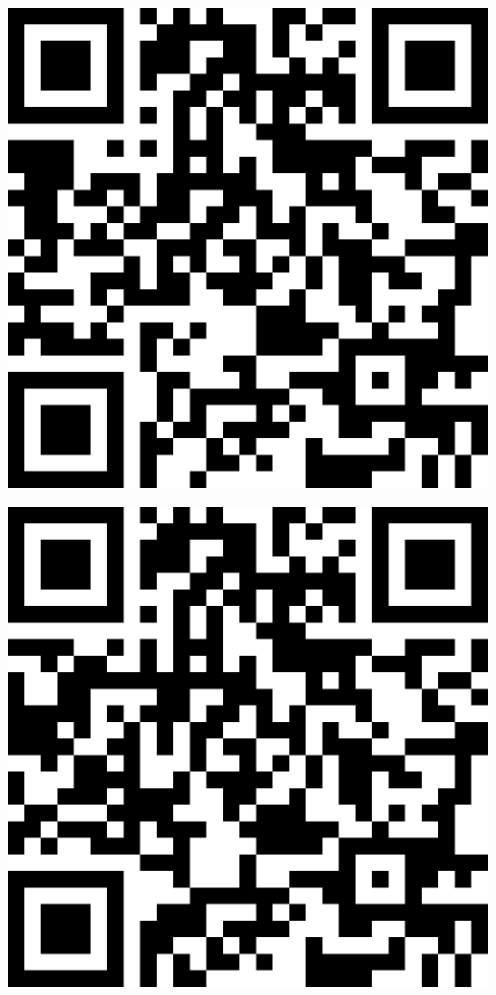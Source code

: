 \documentclass[letterpaper]{article}
\begin{document}
 \endgroup 
 \vspace*{\fill} 
 \pagebreak 
{} 
 \vspace*{\fill} 
 \begingroup 
 \centerline{\includegraphics[scale=1,width=5in,height=5in]{Office3519.png}} 
 \endgroup 
 \vspace*{\fill} 
 \pagebreak 
{} 
 \vspace*{\fill} 
 \begingroup 
 \centerline{\includegraphics[scale=1,width=5in,height=5in]{Office3521.png}} 
\end{document}
